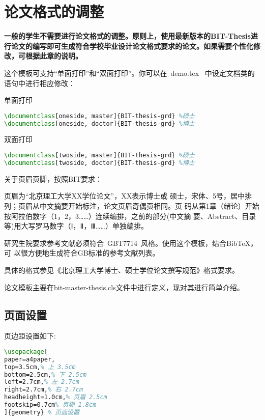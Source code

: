 

\chapter{论文格式的调整}
\label{sec:thesisformat}

\textbf{一般的学生不需要进行论文格式的调整。原则上，使用最新版本的BIT-Thesis进行论文的编写即可生成符合学校毕业设计论文格式要求的论文。如果需要个性化修改，可根据此章的说明。
}

这个模板可支持``单面打印''和``双面打印''。你可以在~demo.tex~
中设定文档类的语句中进行相应修改：

单面打印
\begin{lstlisting}[language={TeX}]
\documentclass[oneside, master]{BIT-thesis-grd} %硕士
\documentclass[oneside, doctor]{BIT-thesis-grd} %博士
\end{lstlisting}

双面打印
\begin{lstlisting}[language={TeX}]
\documentclass[twoside, master]{BIT-thesis-grd} %硕士
\documentclass[twoside, doctor]{BIT-thesis-grd} %博士
\end{lstlisting}

关于页眉页脚，按照BIT要求：

页眉为``北京理工大学XX学位论文''，XX表示博士或
硕士，宋体、5号，居中排列；页眉从中文摘要开始标注，论文页眉奇偶页相同。页
码从第1章（绪论）开始按阿拉伯数字（1，2，3……）连续编排，之前的部分(中文摘
要、Abstract、目录等)用大写罗马数字（Ⅰ，Ⅱ，Ⅲ……）单独编排。

研究生院要求参考文献必须符合~GBT7714~风格。使用这个模板，结合BibTeX，可
以很方便地生成符合GB标准的参考文献列表。

具体的格式参见《北京理工大学博士、硕士学位论文撰写规范》格式要求。

论文模板主要在bit-master-thesis.cls文件中进行定义，现对其进行简单介绍。
\section{页面设置}
页边距设置如下:
\begin{lstlisting}[language={TeX}]
\usepackage[
paper=a4paper,
top=3.5cm,% 上 3.5cm
bottom=2.5cm,% 下 2.5cm
left=2.7cm,% 左 2.7cm
right=2.7cm,% 右 2.7cm
headheight=1.0cm,% 页眉 2.5cm
footskip=0.7cm% 页脚 1.8cm
]{geometry} % 页面设置
\end{lstlisting}

